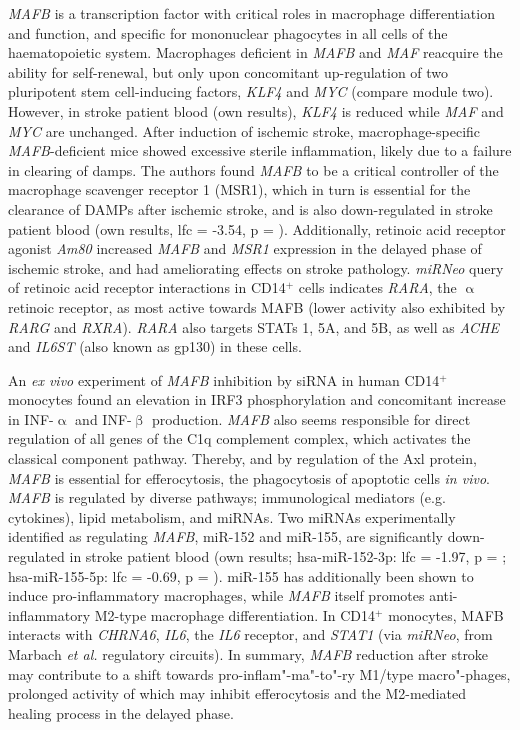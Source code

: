 \emph{MAFB} is a transcription factor with critical roles in macrophage differentiation and function, and specific for mononuclear phagocytes in all cells of the haematopoietic system.\cite{Hamada2020} Macrophages deficient in \emph{MAFB} and \emph{MAF} reacquire the ability for self-renewal, but only upon concomitant up-regulation of two pluripotent stem cell-inducing factors, \emph{KLF4} and \emph{MYC} (compare module two).\cite{Aziz2009} However, in stroke patient blood (own results), \emph{KLF4} is reduced while \emph{MAF} and \emph{MYC} are unchanged. After induction of ischemic stroke, macrophage-specific \emph{MAFB}-deficient mice showed excessive sterile inflammation, likely due to a failure in clearing of \acp{damp}.\cite{Shichita2017} The authors found \emph{MAFB} to be a critical controller of the macrophage scavenger receptor 1 (MSR1), which in turn is essential for the clearance of DAMPs after ischemic stroke, and is also down-regulated in stroke patient blood (own results, \ac{lfc} = -3.54, p = ). Additionally, retinoic acid receptor agonist \emph{Am80} increased \emph{MAFB} and \emph{MSR1} expression in the delayed phase of ischemic stroke, and had ameliorating effects on stroke pathology.\cite{Shichita2017} \emph{miRNeo} query of retinoic acid receptor interactions in CD14$^+$ cells indicates \emph{RARA}, the $\upalpha$ retinoic receptor, as most active towards MAFB (lower activity also exhibited by \emph{RARG} and \emph{RXRA}). \emph{RARA} also targets STATs 1, 5A, and 5B, as well as \emph{ACHE} and \emph{IL6ST} (also known as gp130) in these cells. 

An \emph{ex vivo} experiment of \emph{MAFB} inhibition by siRNA in human CD14$^+$ monocytes found an elevation in IRF3 phosphorylation and concomitant increase in INF-$\upalpha$ and INF-$\upbeta$ production.\cite{Liu2019} \emph{MAFB} also seems responsible for direct regulation of all genes of the C1q complement complex, which activates the classical component pathway.\cite{Tran2017} Thereby, and by regulation of the Axl protein, \emph{MAFB} is essential for efferocytosis, the phagocytosis of apoptotic cells \emph{in vivo}.\cite{Sato2018} \emph{MAFB} is regulated by diverse pathways; immunological mediators (e.g. cytokines), lipid metabolism, and miRNAs.\cite{Hamada2020} Two miRNAs experimentally identified as regulating \emph{MAFB}, miR-152\cite{Tozaki-Saitoh2019} and miR-155\cite{Jablonski2016}, are significantly down-regulated in stroke patient blood (own results; hsa-miR-152-3p: \ac{lfc} = -1.97, p = ; hsa-miR-155-5p: \ac{lfc} = -0.69, p = ). miR-155 has additionally been shown to induce pro-inflammatory macrophages, while \emph{MAFB} itself promotes anti-inflammatory M2-type macrophage differentiation.\cite{Kim2017} In CD14$^+$ monocytes, MAFB interacts with \emph{CHRNA6}, \emph{IL6}, the \emph{IL6} receptor, and \emph{STAT1} (via \emph{miRNeo}, from Marbach \emph{et al.}\cite{Marbach2016} regulatory circuits). In summary, \emph{MAFB} reduction after stroke may contribute to a shift towards pro-inflam"-ma"-to"-ry M1\-/type macro"-phages, prolonged activity of which may inhibit efferocytosis and the M2-mediated healing process in the delayed phase.

